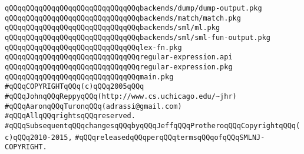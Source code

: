 \verb|qQQqqQQqqQQqqQQqqQQqqQQqqQQqqQQqbackends/dump/dump-output.pkg|\newline
\verb|qQQqqQQqqQQqqQQqqQQqqQQqqQQqqQQqbackends/match/match.pkg|\newline
\newline
\verb|qQQqqQQqqQQqqQQqqQQqqQQqqQQqqQQqbackends/sml/ml.pkg|\newline
\verb|qQQqqQQqqQQqqQQqqQQqqQQqqQQqqQQqbackends/sml/sml-fun-output.pkg|\newline
\newline
\verb|qQQqqQQqqQQqqQQqqQQqqQQqqQQqqQQqlex-fn.pkg|\newline
\verb|qQQqqQQqqQQqqQQqqQQqqQQqqQQqqQQqregular-expression.api|\newline
\verb|qQQqqQQqqQQqqQQqqQQqqQQqqQQqqQQqregular-expression.pkg|\newline
\verb|qQQqqQQqqQQqqQQqqQQqqQQqqQQqqQQqmain.pkg|\newline
\newline
\newline
\verb|#qQQqCOPYRIGHTqQQq(c)qQQq2005qQQq|\newline
\verb|#qQQqJohnqQQqReppyqQQq(http://www.cs.uchicago.edu/~jhr)|\newline
\verb|#qQQqAaronqQQqTuronqQQq(adrassi@gmail.com)|\newline
\verb|#qQQqAllqQQqrightsqQQqreserved.|\newline
\verb|#qQQqSubsequentqQQqchangesqQQqbyqQQqJeffqQQqProtheroqQQqCopyrightqQQq(c)qQQq2010-2015,|\newline
\verb|#qQQqreleasedqQQqperqQQqtermsqQQqofqQQqSMLNJ-COPYRIGHT.|\newline

